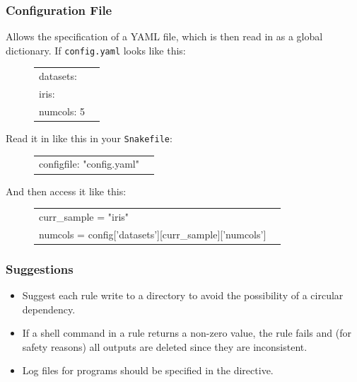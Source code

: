 \begin{frame}

\frametitle{Configuration File}

Allows the specification of a YAML file, which is then read in as a global dictionary.  If {\texttt{config.yaml}} looks like this:
\vs

\begin{figure}
  \begin{tabular}{lc}
  datasets:\\
  {\D\D}iris:\\
  {\D\D}{\D\D}numcols: 5\\
  \end{tabular}
\end{figure}

Read it in like this in your {\texttt{Snakefile}}:

\begin{figure}
  \begin{tabular}{lc}
  configfile: "config.yaml" \\
  \end{tabular}
\end{figure}

And then access it like this:

\begin{figure}
  \begin{tabular}{lc}
  curr\_sample = "iris"\\
  numcols = config['datasets'][curr\_sample]['numcols']\\
  \end{tabular}
\end{figure}

\end{frame}


\begin{frame}

\frametitle{Suggestions}

\begin{itemize}
  \item Suggest each rule write to a {} directory to avoid the possibility of a circular dependency.
  \item If a shell command in a rule returns a non-zero value, the rule fails and (for safety reasons) all outputs are deleted since they are inconsistent.
  \item Log files for programs should {} be specified in the {} directive.
\end{itemize}

\end{frame}



